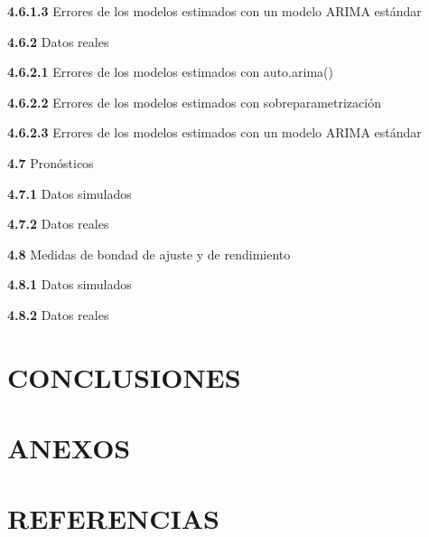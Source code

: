 \documentclass[
]{article}
\begin{document}
\textbf{4.6.1.3} Errores de los modelos estimados con un modelo ARIMA
estándar

\textbf{4.6.2} Datos reales

\textbf{4.6.2.1} Errores de los modelos estimados con auto.arima()

\textbf{4.6.2.2} Errores de los modelos estimados con
sobreparametrización

\textbf{4.6.2.3} Errores de los modelos estimados con un modelo ARIMA
estándar

\textbf{4.7} Pronósticos

\textbf{4.7.1} Datos simulados

\textbf{4.7.2} Datos reales

\textbf{4.8} Medidas de bondad de ajuste y de rendimiento

\textbf{4.8.1} Datos simulados

\textbf{4.8.2} Datos reales

\section{CONCLUSIONES}

\newpage

\section{ANEXOS}

\newpage

\section{REFERENCIAS}
\end{document}
